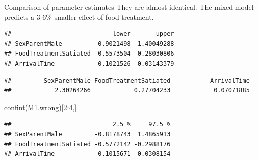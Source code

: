 \documentclass[
  ignorenonframetext,
]{beamer}
\newenvironment{Shaded}{\begin{snugshade}}{\end{snugshade}}
\newcommand{\DecValTok}[1]{\textcolor[rgb]{0.00,0.00,0.81}{#1}}
\newcommand{\FunctionTok}[1]{\textcolor[rgb]{0.00,0.00,0.00}{#1}}
\newcommand{\NormalTok}[1]{#1}
\newcommand{\SpecialCharTok}[1]{\textcolor[rgb]{0.00,0.00,0.00}{#1}}
\begin{document}
\begin{frame}[fragile]{Comparison of parameter estimates}
\protect\hypertarget{comparison-of-parameter-estimates}{}
They are almost identical. The mixed model predicts a 3-6\% smaller
effect of food treatment.

\scriptsize

\begin{Shaded}
\end{Shaded}

\begin{verbatim}
##                            lower       upper
## SexParentMale         -0.9021498  1.40049288
## FoodTreatmentSatiated -0.5573504 -0.28030806
## ArrivalTime           -0.1021526 -0.03143379
\end{verbatim}

\begin{Shaded}
\end{Shaded}

\begin{verbatim}
##         SexParentMale FoodTreatmentSatiated           ArrivalTime 
##            2.30264266            0.27704233            0.07071885
\end{verbatim}

\begin{Shaded}
\begin{Highlighting}[]
\FunctionTok{confint}\NormalTok{(M1.wrong)[}\DecValTok{2}\SpecialCharTok{:}\DecValTok{4}\NormalTok{,]}
\end{Highlighting}
\end{Shaded}

\begin{verbatim}
##                            2.5 %     97.5 %
## SexParentMale         -0.8178743  1.4865913
## FoodTreatmentSatiated -0.5772142 -0.2988176
## ArrivalTime           -0.1015671 -0.0308154
\end{verbatim}


\end{frame}
\end{document}
